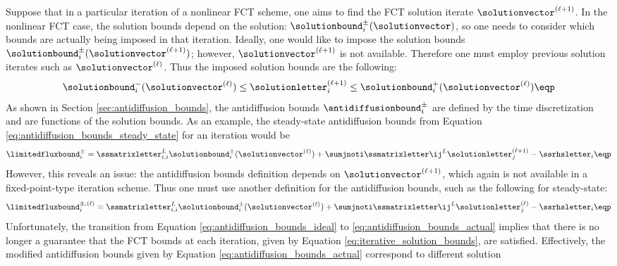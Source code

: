 Suppose that in a particular iteration of a nonlinear FCT scheme, one
aims to find the FCT solution iterate $\solutionvector^{(\ell+1)}$.
In the nonlinear FCT case, the solution bounds depend on the solution:
$\solutionbound_i^\pm(\solutionvector)$, so one needs to consider which
bounds are actually being imposed in that iteration. Ideally, one would
like to impose the solution bounds
$\solutionbound_i^\pm(\solutionvector^{(\ell+1)})$; however,
$\solutionvector^{(\ell+1)}$ is not available. Therefore one must employ
previous solution iterates such as $\solutionvector^{(\ell)}$.
Thus the imposed solution bounds are the following:
\begin{equation}\label{eq:iterative_solution_bounds} 
  \solutionbound_i^-(\solutionvector^{(\ell)})
  \leq \solutionletter_i^{(\ell+1)}
  \leq \solutionbound_i^+(\solutionvector^{(\ell)})
  \eqp
\end{equation}
As shown in Section \ref{sec:antidiffusion_bounds}, the antidiffusion bounds
$\antidiffusionbound_i^\pm$ are defined by the time discretization and are
functions of the solution bounds. As an example, the steady-state
antidiffusion bounds from Equation \eqref{eq:antidiffusion_bounds_steady_state}
for an iteration would be
\begin{equation}\label{eq:antidiffusion_bounds_ideal}
  \limitedfluxbound_i^\pm =
    \ssmatrixletter_{i,i}^L \solutionbound_i^\pm(\solutionvector^{(\ell)})
    + \sumjnoti\ssmatrixletter\ij^L\solutionletter_j^{(\ell+1)} - \ssrhsletter_i
  \eqp
\end{equation}
However, this reveals an issue: the antidiffusion bounds definition depends on
$\solutionvector^{(\ell+1)}$, which again is not available in a fixed-point-type
iteration scheme.
Thus one must use another definition for the antidiffusion bounds, such as the
following for steady-state:
\begin{equation}\label{eq:antidiffusion_bounds_actual}
  \limitedfluxbound_i^{\pm,(\ell)} \equiv
    \ssmatrixletter_{i,i}^L \solutionbound_i^\pm(\solutionvector^{(\ell)})
    + \sumjnoti\ssmatrixletter\ij^L\solutionletter_j^{(\ell)} - \ssrhsletter_i
  \eqp
\end{equation}
Unfortunately, the transition from Equation
\eqref{eq:antidiffusion_bounds_ideal} to \eqref{eq:antidiffusion_bounds_actual}
implies that there is no longer a guarantee that the FCT bounds at each
iteration, given by Equation \eqref{eq:iterative_solution_bounds}, are satisfied.
Effectively, the modified antidiffusion bounds given by Equation
\eqref{eq:antidiffusion_bounds_actual} correspond to different solution
